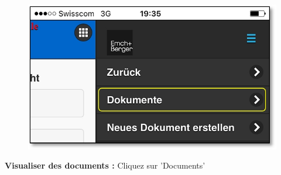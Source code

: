 \begin{figure}   %
  \vspace{-35pt}      %
  \begin{center}
    \includegraphics[width=1\linewidth]{../chapters/11_Dokumentenablage/pictures/11-mob02_Dokumente_anschauen.jpg}
  \end{center}
  \vspace{-20pt}
  \vspace{-10pt}
\end{figure}


\textbf{Visualiser des documents :} Cliquez sur 'Documents'

\pagebreak


